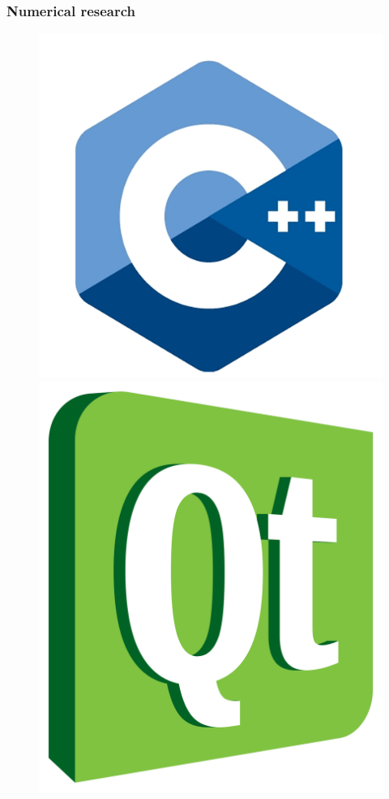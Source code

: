 \documentclass[fullscreen=true, unicode, bookmarks=false]{beamer}
\begin{document}
\begin{frame}
\frametitle{Numerical research} 
\begin{figure}
\includegraphics[scale=0.1]{cplusplus.png}
\hfill 
\includegraphics[scale=0.04]{qt.png}

\end{figure}
\end{frame}
\end{document}
